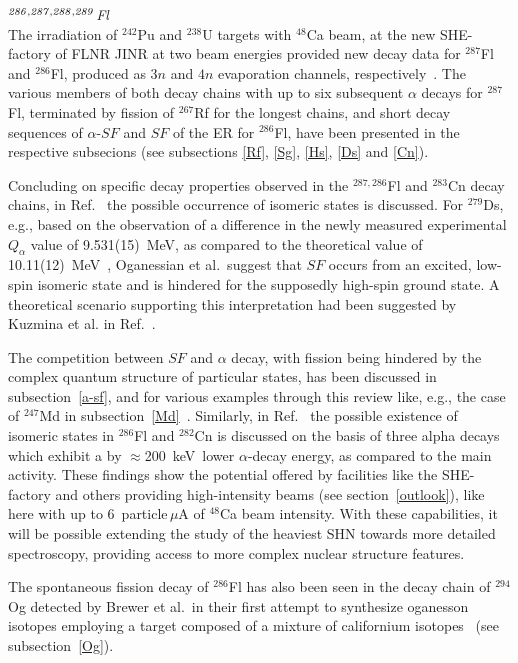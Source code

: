 {\it $^{\it286,287,288,289}$Fl}\\
The irradiation of $^{242}$Pu and $^{238}$U targets with $^{48}$Ca beam, at the new SHE-factory of FLNR JINR at two beam energies provided new decay data for $^{287}$Fl and $^{286}$Fl, produced as $3n$ and $4n$ evaporation channels, respectively~\cite{Oganessian2022b}.
The various members of both decay chains with up to six subsequent $\alpha$ decays for $^{287}$Fl, terminated by fission of  $^{267}$Rf for the longest chains, and short decay sequences of $\alpha$-$SF$ and $SF$ of the ER for $^{286}$Fl, have been presented in the respective subsecions (see subsections \ref{Rf}, \ref{Sg}, \ref{Hs}, \ref{Ds} and \ref{Cn}).

Concluding on specific decay properties observed in the $^{287,286}$Fl and $^{283}$Cn decay chains, in Ref.~\cite{Oganessian2022b} the possible occurrence of isomeric states is discussed. 
For $^{279}$Ds, e.g., based on the observation of a difference in the newly measured experimental $Q_\alpha$ value of 9.531(15)~MeV, as compared to the theoretical value of 10.11(12)~MeV~\cite{Wang2021}, Oganessian et al.~suggest that $SF$ occurs from an excited, low-spin isomeric state and is hindered for the supposedly high-spin ground state. 
A theoretical scenario supporting this interpretation had been suggested by Kuzmina et al. in Ref.~\cite{Kuzmina2012}.

The competition between $SF$ and $\alpha$ decay, with fission being hindered by the complex quantum structure of particular states, has been discussed in subsection~\ref{a-sf}, and for various examples through this review like, e.g., the case of $^{247}$Md in subsection~\ref{Md}~\cite{Hessberger2022}.
Similarly, in Ref.~\cite{Oganessian2022b} the possible existence of isomeric states in $^{286}$Fl and $^{282}$Cn is discussed on the basis of three alpha decays which exhibit a by $\approx$200~keV\ lower $\alpha$-decay energy, as compared to the main activity.
These findings show the potential offered by facilities like the SHE-factory and others providing high-intensity beams (see section~\ref{outlook}), like here with up to 6~particle\,$\mu$A of $^{48}$Ca beam intensity.
With these capabilities, it will be possible extending the study of the heaviest SHN towards more detailed spectroscopy, providing access to more complex nuclear structure features.

The spontaneous fission decay of $^{286}$Fl has also been seen in the decay chain of $^{294}$Og detected by Brewer et al.~in their first attempt to synthesize oganesson isotopes employing a target composed of a mixture of californium isotopes~\cite{Brewer2018} (see subsection~\ref{Og}).

